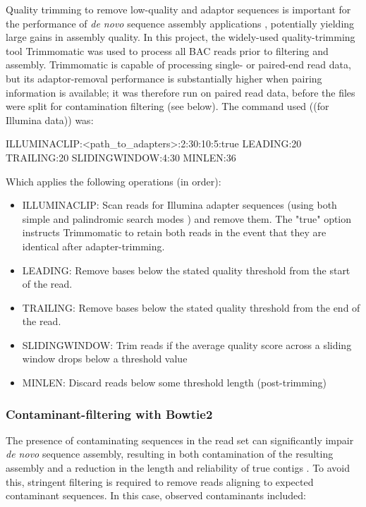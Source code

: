 Quality trimming to remove low-quality and adaptor sequences is important for the performance of \textit{de novo} sequence assembly applications \citep{bolger2014trimmomatic}, potentially yielding large gains in assembly quality. In this project, the widely-used quality-trimming tool Trimmomatic \citep{bolger2014trimmomatic} was used to process all BAC reads prior to filtering and assembly. Trimmomatic is capable of processing single- or paired-end read data, but its adaptor-removal performance is substantially higher when pairing information is available; it was therefore run on paired read data, before the files were split for contamination filtering (see below). The command used ((for Illumina data)) was:

ILLUMINACLIP:<path_to_adapters>:2:30:10:5:true LEADING:20 TRAILING:20 SLIDINGWINDOW:4:30 MINLEN:36 %

Which applies the following operations (in order):

\begin{itemize}
\item ILLUMINACLIP: Scan reads for Illumina adapter sequences (using both simple and palindromic search modes \citep{bolger2014trimmomatic}) and remove them. The "true" option instructs Trimmomatic to retain both reads in the event that they are identical after adapter-trimming.
\item LEADING: Remove bases below the stated quality threshold from the start of the read.
\item TRAILING: Remove bases below the stated quality threshold from the end of the read.
\item SLIDINGWINDOW: Trim reads if the average quality score across a sliding window drops below a threshold value
\item MINLEN: Discard reads below some threshold length (post-trimming)
\end{itemize}


\subsubsection{Contaminant-filtering with Bowtie2}

The presence of contaminating sequences in the read set can significantly impair \textit{de novo} sequence assembly, resulting in both contamination of the resulting assembly and a reduction in the length and reliability of true contigs %
. To avoid this, stringent filtering is required to remove reads aligning to expected contaminant sequences. In this case, observed contaminants included:

